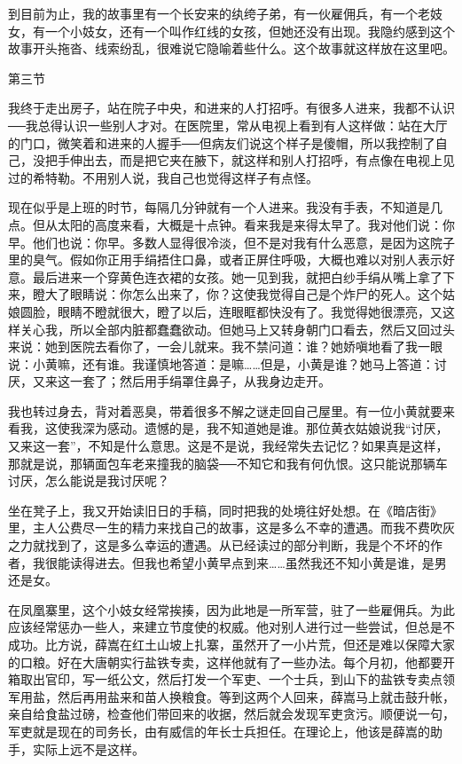 到目前为止，我的故事里有一个长安来的纨绔子弟，有一伙雇佣兵，有一个老妓女，有一个小妓女，还有一个叫作红线的女孩，但她还没有出现。我隐约感到这个故事开头拖沓、线索纷乱，很难说它隐喻着些什么。这个故事就这样放在这里吧。 

第三节 

我终于走出房子，站在院子中央，和进来的人打招呼。有很多人进来，我都不认识──我总得认识一些别人才对。在医院里，常从电视上看到有人这样做：站在大厅的门口，微笑着和进来的人握手──但病友们说这个样子是傻帽，所以我控制了自己，没把手伸出去，而是把它夹在腋下，就这样和别人打招呼，有点像在电视上见过的希特勒。不用别人说，我自己也觉得这样子有点怪。 

现在似乎是上班的时节，每隔几分钟就有一个人进来。我没有手表，不知道是几点。但从太阳的高度来看，大概是十点钟。看来我是来得太早了。我对他们说：你早。他们也说：你早。多数人显得很冷淡，但不是对我有什么恶意，是因为这院子里的臭气。假如你正用手绢捂住口鼻，或者正屏住呼吸，大概也难以对别人表示好意。最后进来一个穿黄色连衣裙的女孩。她一见到我，就把白纱手绢从嘴上拿了下来，瞪大了眼睛说：你怎么出来了，你？这使我觉得自己是个炸尸的死人。这个姑娘圆脸，眼睛不瞪就很大，瞪了以后，连眼眶都快没有了。我觉得她很漂亮，又这样关心我，所以全部内脏都蠢蠢欲动。但她马上又转身朝门口看去，然后又回过头来说：她到医院去看你了，一会儿就来。我不禁问道：谁？她娇嗔地看了我一眼说：小黄嘛，还有谁。我谨慎地答道：是嘛……但是，小黄是谁？她马上答道：讨厌，又来这一套了；然后用手绢罩住鼻子，从我身边走开。 

我也转过身去，背对着恶臭，带着很多不解之谜走回自己屋里。有一位小黄就要来看我，这使我深为感动。遗憾的是，我不知道她是谁。那位黄衣姑娘说我“讨厌，又来这一套”，不知是什么意思。这是不是说，我经常失去记忆？如果真是这样，那就是说，那辆面包车老来撞我的脑袋──不知它和我有何仇恨。这只能说那辆车讨厌，怎么能说是我讨厌呢？ 

坐在凳子上，我又开始读旧日的手稿，同时把我的处境往好处想。在《暗店街》里，主人公费尽一生的精力来找自己的故事，这是多么不幸的遭遇。而我不费吹灰之力就找到了，这是多么幸运的遭遇。从已经读过的部分判断，我是个不坏的作者，我很能读得进去。但我也希望小黄早点到来……虽然我还不知小黄是谁，是男还是女。 

在凤凰寨里，这个小妓女经常挨揍，因为此地是一所军营，驻了一些雇佣兵。为此应该经常惩办一些人，来建立节度使的权威。他对别人进行过一些尝试，但总是不成功。比方说，薛嵩在红土山坡上扎寨，虽然开了一小片荒，但还是难以保障大家的口粮。好在大唐朝实行盐铁专卖，这样他就有了一些办法。每个月初，他都要开箱取出官印，写一纸公文，然后打发一个军吏、一个士兵，到山下的盐铁专卖点领军用盐，然后再用盐来和苗人换粮食。等到这两个人回来，薛嵩马上就击鼓升帐，亲自给食盐过磅，检查他们带回来的收据，然后就会发现军吏贪污。顺便说一句，军吏就是现在的司务长，由有威信的年长士兵担任。在理论上，他该是薛嵩的助手，实际上远不是这样。 

